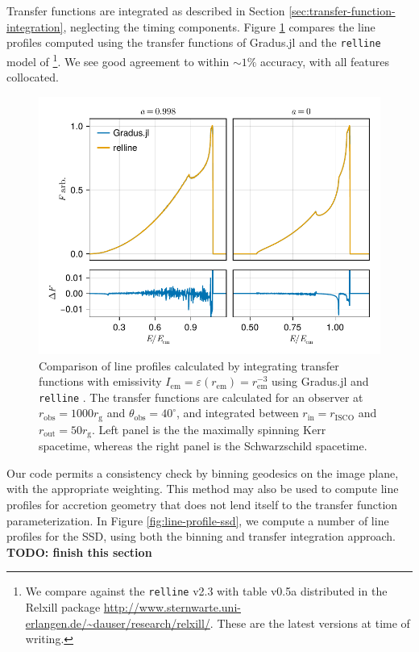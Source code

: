 \documentclass[fleqn,usenatbib]{mnras}
\newcommand{\todo}[1]{{\noindent \bf \color{red} TODO: #1}}
\newcommand{\Gradus}{Gradus.jl }
\newcommand{\relline}{\texttt{relline} }
\newcommand{\rg}{r_\text{g}}
\newcommand{\risco}{r_\text{ISCO}}
\begin{document}
Transfer functions are integrated as described in Section \ref{sec:transfer-function-integration}, neglecting the timing components. Figure \ref{fig:relline-comparison} compares the line profiles computed using the transfer functions of \Gradus and the \relline model of \cite{dauser_broad_2010}\footnote{We compare against the \relline v2.3 with table v0.5a distributed in the Relxill package \url{http://www.sternwarte.uni-erlangen.de/~dauser/research/relxill/}. These are the latest versions at time of writing.}. We see good agreement to within $\sim 1\%$ accuracy, with all features collocated.

\begin{figure}
	\centering
	\includegraphics[width=0.99\linewidth]{figures/lineprofiles.comparison.pdf}
	\caption{Comparison of line profiles calculated by integrating transfer functions with emissivity $I_\text{em} = \varepsilon(r_\text{em}) = r_\text{em}^{-3}$ using \Gradus and \relline. The transfer functions are calculated for an observer at $r_\text{obs} = 1000\rg$ and $\theta_\text{obs} = 40^\circ$, and integrated between $r_\text{in} = \risco$ and $r_\text{out} = 50 \rg$. Left panel is the the maximally spinning Kerr spacetime, whereas the right panel is the Schwarzschild spacetime.}
	\label{fig:relline-comparison}
\end{figure}

Our code permits a consistency check by binning geodesics on the image plane, with the appropriate weighting. This method may also be used to compute line profiles for accretion geometry that does not lend itself to the transfer function parameterization. In Figure \ref{fig:line-profile-ssd}, we compute a number of line profiles for the SSD, using both the binning and transfer integration approach. \todo{finish this section}
\end{document}
